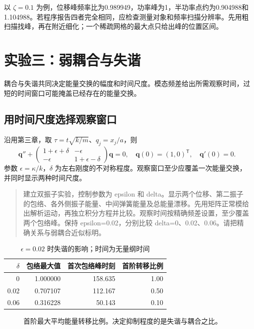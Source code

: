 \documentclass[11pt,openany,fontset=fandol]{ctexbook}
\theoremstyle{plain}\newtheorem{theorem}{定理}[chapter]\newtheorem{proposition}[theorem]{命题}
\theoremstyle{definition}\newtheorem{definition}{定义}[chapter]\newtheorem{example}{例}[chapter]
\theoremstyle{remark}\newtheorem*{remark}{说明}
\newcommand{\vct}[1]{\bm{#1}}\newcommand{\Rea}{\operatorname{Re}}\newcommand{\Ima}{\operatorname{Im}}
\begin{document}
以 $\zeta=0.1$ 为例，位移峰频率比为0.989949，功率峰为1，半功率点约为0.904988和1.104988。若程序报告四者完全相同，应检查测量对象和频率扫描分辨率。先用粗扫描找峰，再在附近细化；一个稀疏网格的最大点只给出峰的位置区间。

\section{实验三：弱耦合与失谐}
耦合与失谐共同决定能量交换的幅度和时间尺度。模态频差给出所需观察时间，过短的时间窗口可能掩盖已经存在的能量交换。

\subsection{用时间尺度选择观察窗口}
沿用第三章，取 $\tau=t\sqrt{k/m}$、$q_j=x_j/a$，则
\[
\vct q''+\begin{pmatrix}1+\epsilon+\delta&-\epsilon\\-\epsilon&1+\epsilon-\delta\end{pmatrix}\vct q=0,
\quad\vct q(0)=(1,0)^{\mathsf T},\quad\vct q'(0)=0.
\]
参数 $\epsilon=\kappa/k$，$\delta$ 为左右刚度的不对称程度。观察窗口至少应覆盖一次能量交换，并同时显示两种时间尺度。

\begin{quote}\small
建立双振子实验，控制参数为 epsilon 和 delta。显示两个位移、第二振子的包络、各外侧振子能量、中间弹簧能量及总能量漂移。先用矩阵正常模给出解析运动，再独立积分方程并比较。观察时间按精确频差设置，至少覆盖两个包络峰。保持 epsilon=0.02，分别比较 delta=0、0.02、0.06。请把精确关系与弱耦合近似标明。
\end{quote}

\begin{table}[htbp]\centering\caption{$\epsilon=0.02$ 时失谐的影响；时间为无量纲时间}
\begin{tabular}{rrrr}\toprule
$\delta$ & 包络最大值 & 首次包络峰时刻 & 首阶转移比例\\\midrule
0 &1.000000&158.635&1.00\\
0.02&0.707107&112.167&0.50\\
0.06&0.316228&50.143&0.10\\\bottomrule
\end{tabular}\end{table}

\begin{figure}[htbp]\centering
{}
\caption{首阶最大平均能量转移比例。决定抑制程度的是失谐与耦合之比。}
\label{fig:orig-088}
\end{figure}
\end{document}
